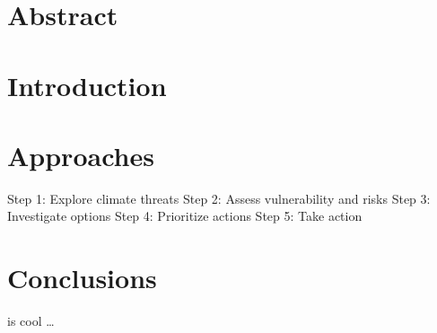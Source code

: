 \documentclass[10pt]{amsart}
\begin{document}
\section{Abstract}
\section{Introduction}
\section{Approaches}
Step 1: Explore climate threats
Step 2: Assess vulnerability and risks
Step 3: Investigate options
Step 4: Prioritize actions
Step 5: Take action
\section{Conclusions}
\cite{licuanan2015ic} is cool \ldots



\newpage
\printbibliography
\end{document}
